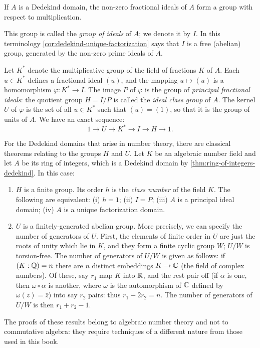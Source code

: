 \begin{corollary}\label{cor:fractional-ideals-group}
If $A$ is a Dedekind domain, the non-zero fractional ideals of $A$ form a group with respect to multiplication.
\end{corollary}

This group is called the \emph{group of ideals} of $A$; we denote it by $I$. In this terminology \eqref{cor:dedekind-unique-factorization} says that $I$ is a free (abelian) group, generated by the non-zero prime ideals of $A$.

Let $K^*$ denote the multiplicative group of the field of fractions $K$ of $A$. Each $u \in K^*$ defines a fractional ideal $(u)$, and the mapping $u \mapsto (u)$ is a homomorphism $\varphi \colon K^* \to I$. The image $P$ of $\varphi$ is the group of \emph{principal fractional ideals}: the quotient group $H = I/P$ is called the \emph{ideal class group} of $A$. The kernel $U$ of $\varphi$ is the set of all $u \in K^*$ such that $(u) = (1)$, so that it is the group of units of $A$. We have an exact sequence:
\[
    1 \longrightarrow U \longrightarrow K^* \longrightarrow I \longrightarrow H \longrightarrow 1.
\]

\begin{remark}
For the Dedekind domains that arise in number theory, there are classical theorems relating to the groups $H$ and $U$. Let $K$ be an algebraic number field and let $A$ be its ring of integers, which is a Dedekind domain by \eqref{thm:ring-of-integers-dedekind}. In this case:
\begin{enumerate}[1)]
    \item $H$ is a finite group. Its order $h$ is the \emph{class number} of the field $K$. The following are equivalent: (i) $h = 1$; (ii) $I = P$; (iii) $A$ is a principal ideal domain; (iv) $A$ is a unique factorization domain.
    
    \item $U$ is a finitely-generated abelian group. More precisely, we can specify the number of generators of $U$. First, the elements of finite order in $U$ are just the roots of unity which lie in $K$, and they form a finite cyclic group $W$; $U/W$ is torsion-free. The number of generators of $U/W$ is given as follows: if $(K:\mathbb{Q}) = n$ there are $n$ distinct embeddings $K \to \mathbb{C}$ (the field of complex numbers). Of these, say $r_1$ map $K$ into $\mathbb{R}$, and the rest pair off (if $\alpha$ is one, then $\omega \circ \alpha$ is another, where $\omega$ is the automorphism of $\mathbb{C}$ defined by $\omega(z) = \bar{z}$) into say $r_2$ pairs: thus $r_1 + 2r_2 = n$. The number of generators of $U/W$ is then $r_1 + r_2 - 1$.
\end{enumerate}

The proofs of these results belong to algebraic number theory and not to commutative algebra: they require techniques of a different nature from those used in this book.
\end{remark}

